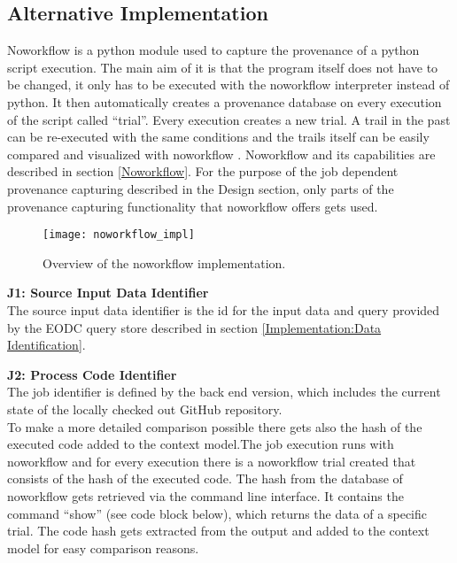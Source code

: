 \documentclass[draft,final]{vutinfth} %
\begin{document}
\subsection{Alternative Implementation}\label{Implementation:Noworkflow Implementation}
Noworkflow is a python module used to capture the provenance of a python script execution. The main aim of it is that the program itself does not have to be changed, it only has to be executed with the noworkflow interpreter instead of python. It then automatically creates a provenance database on every execution of the script called “trial”. Every execution creates a new trial. A trail in the past can be re-executed with the same conditions and the trails itself can be easily compared and visualized with noworkflow \cite{c9e0604becba42af96a9cb0a6f60018b}. Noworkflow and its capabilities are described in section \ref{Noworkflow}. 
For the purpose of the job dependent provenance capturing described in the Design section, only parts of the provenance capturing functionality that noworkflow offers gets used.    

\begin{figure}[h]
	\centering
	\texttt{[image: noworkflow\_impl]}
	\caption{Overview of the noworkflow implementation.}
	\label{fig:noworkflow_impl} %
\end{figure}

\textbf{J1:  Source Input Data Identifier} \\
The source input data identifier is the id for the input data and query provided by the EODC query store described in section \ref{Implementation:Data Identification}. 


\textbf{J2: Process Code Identifier} \\
The job identifier is defined by the back end version, which includes the current state of the locally checked out GitHub repository.\\
To make a more detailed comparison possible there gets also the hash of the executed code added to the context model.The job execution runs with noworkflow and for every execution there is a noworkflow trial created that consists of the hash of the executed code. The hash from the database of noworkflow gets retrieved via the command line interface. It contains the command “show” (see code block below), which returns the data of a specific trial. The code hash gets extracted from the output and added to the context model for easy comparison reasons. 
\end{document}

